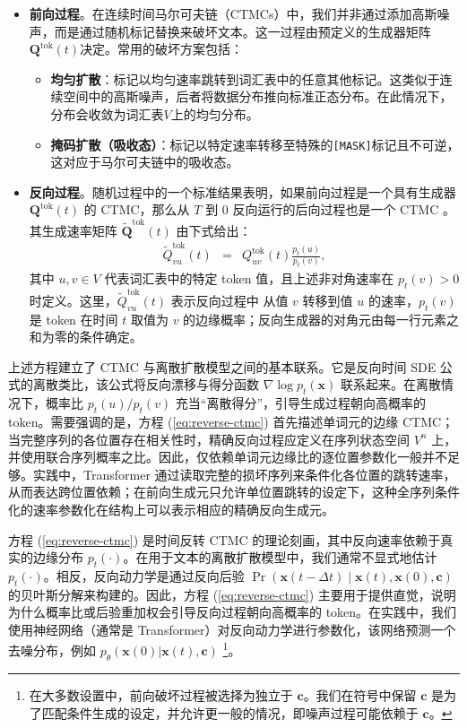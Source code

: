 \begin{itemize}
\item \textbf{前向过程}。在连续时间马尔可夫链（CTMCs）中，我们并非通过添加高斯噪声，而是通过随机标记替换来破坏文本。这一过程由预定义的生成器矩阵$\mathbf{Q}^{\mathrm{tok}}(t)$决定。常用的破坏方案包括：
    \begin{itemize}
    \item \textbf{均匀扩散}：标记以均匀速率跳转到词汇表中的任意其他标记。这类似于连续空间中的高斯噪声，后者将数据分布推向标准正态分布。在此情况下，分布会收敛为词汇表$V$上的均匀分布。
    \item \textbf{掩码扩散（吸收态）}：标记以特定速率转移至特殊的\texttt{[MASK]}标记且不可逆，这对应于马尔可夫链中的吸收态。
    \end{itemize}
\item \textbf{反向过程}。随机过程中的一个标准结果表明，如果前向过程是一个具有生成器 $\mathbf{Q}^{\mathrm{tok}}(t)$ 的 CTMC，那么从 $T$ 到 $0$ 反向运行的后向过程也是一个 CTMC \citep{anderson:1982reverse}。其生成速率矩阵 $\tilde{\mathbf{Q}}^{\mathrm{tok}}(t)$ 由下式给出：
\begin{eqnarray}
\tilde{Q}^{\mathrm{tok}}_{vu}(t) & = & Q^{\mathrm{tok}}_{uv}(t) \frac{p_t(u)}{p_t(v)}, \label{eq:reverse-ctmc}
\end{eqnarray}
\noindent 其中 $u, v \in V$ 代表词汇表中的特定 token 值，且上述非对角速率在
$p_t(v)>0$ 时定义。这里，$\tilde{Q}^{\mathrm{tok}}_{vu}(t)$ 表示反向过程中
从值 $v$ 转移到值 $u$ 的速率，$p_t(v)$ 是 token 在时间 $t$ 取值为 $v$
的边缘概率；反向生成器的对角元由每一行元素之和为零的条件确定。
\end{itemize}

上述方程建立了 CTMC 与离散扩散模型之间的基本联系。它是反向时间 SDE 公式的离散类比，该公式将反向漂移与得分函数 $\nabla \log p_t(\mathbf{x})$ 联系起来。在离散情况下，概率比 $p_t(u)/p_t(v)$ 充当“离散得分”，引导生成过程朝向高概率的 token。需要强调的是，方程 (\ref{eq:reverse-ctmc}) 首先描述单词元的边缘 CTMC；当完整序列的各位置存在相关性时，精确反向过程应定义在序列状态空间 $V^n$ 上，并使用联合序列概率之比。因此，仅依赖单词元边缘比的逐位置参数化一般并不足够。实践中，Transformer 通过读取完整的损坏序列来条件化各位置的跳转速率，从而表达跨位置依赖；在前向生成元只允许单位置跳转的设定下，这种全序列条件化的速率参数化在结构上可以表示相应的精确反向生成元。

方程 (\ref{eq:reverse-ctmc}) 是时间反转 CTMC 的理论刻画，其中反向速率依赖于真实的边缘分布 $p_t(\cdot)$。在用于文本的离散扩散模型中，我们通常不显式地估计 $p_t(\cdot)$。相反，反向动力学是通过反向后验 $\Pr(\mathbf{x}(t-\Delta t)\mid \mathbf{x}(t),\mathbf{x}(0),\mathbf{c})$ 的贝叶斯分解来构建的。因此，方程 (\ref{eq:reverse-ctmc}) 主要用于提供直觉，说明为什么概率比或后验重加权会引导反向过程朝向高概率的 token。在实践中，我们使用神经网络（通常是 Transformer）对反向动力学进行参数化，该网络预测一个去噪分布，例如 $p_\theta(\mathbf{x}(0)| \mathbf{x}(t),\mathbf{c})$ \footnote{在大多数设置中，前向破坏过程被选择为独立于 $\mathbf{c}$。我们在符号中保留 $\mathbf{c}$ 是为了匹配条件生成的设定，并允许更一般的情况，即噪声过程可能依赖于 $\mathbf{c}$。}。

